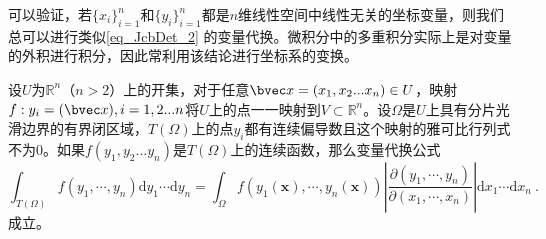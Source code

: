 可以验证，若$\{x_i\}^n_{i=1}$和$\{y_i\}^n_{i=1}$都是$n$维线性空间中线性无关的坐标变量，则我们总可以进行类似\autoref{eq_JcbDet_2} 的变量代换。微积分中的多重积分实际上是对变量的外积进行积分，因此常利用该结论进行坐标系的变换。

\begin{theorem}{}
设$U$为$\mathbb R^n$（$n>2$）上的开集，对于任意$\bvec x=(x_1,x_2...x_n)\in U$，映射$f:y_i=(\bvec x),i=1,2...n$将$U$上的点一一映射到$V\subset \mathbb R^n$。设$\Omega$是$U$上具有分片光滑边界的有界闭区域，$T(\Omega)$上的点$y_i$都有连续偏导数且这个映射的雅可比行列式不为$0$。如果$f(y_1,y_2...y_n)$是$T(\Omega)$上的连续函数，那么变量代换公式
\begin{equation}
\int_{T(\Omega)} f\left(y_1, \cdots, y_n\right) \mathrm{d} y_1 \cdots \mathrm{d} y_n=\int_{\Omega} f\left(y_1(\boldsymbol{x}), \cdots, y_n(\boldsymbol{x})\right)\left|\frac{\partial\left(y_1, \cdots, y_n\right)}{\partial\left(x_1, \cdots, x_n\right)}\right| \mathrm{d} x_1 \cdots \mathrm{d} x_n~.
\end{equation}
成立。
\end{theorem}
